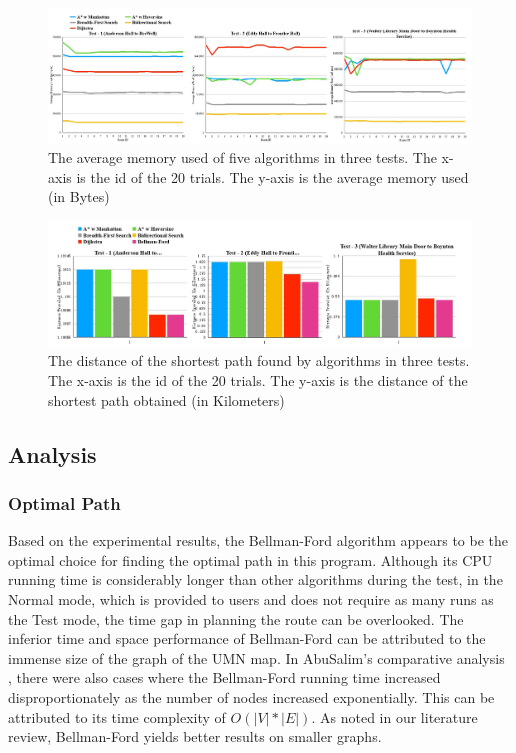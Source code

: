 \documentclass[12pt]{article}
\begin{document}
\begin{figure}[H]
\centering
\includegraphics[scale=0.36]{images/memory usage data.jpg}
\caption{The average memory used of five algorithms in three tests. The x-axis is the id of the 20 trials. The y-axis is the average memory used (in Bytes)}
\label{fig: memory usage}
\end{figure}

\begin{figure}[H]
\centering
\includegraphics[scale=0.45]{images/distance data.jpg}
\caption{The distance of the shortest path found by algorithms in three tests. The x-axis is the id of the 20 trials. The y-axis is the distance of the shortest path obtained (in Kilometers)}
\label{fig: distance traveled}
\end{figure}


\subsection{Analysis}

\subsubsection{Optimal Path}

Based on the experimental results, the Bellman-Ford algorithm appears to be the optimal choice for finding the optimal path in this program. Although its CPU running time is considerably longer than other algorithms during the test, in the Normal mode, which is provided to users and does not require as many runs as the Test mode, the time gap in planning the route can be overlooked. The inferior time and space performance of Bellman-Ford can be attributed to the immense size of the graph of the UMN map. In AbuSalim's comparative analysis \cite{AbuSalim_Ibrahim_Zainuri_Saringat_Jamel_Abdul_Wahab_2020}, there were also cases where the Bellman-Ford running time increased disproportionately as the number of nodes increased exponentially. This can be attributed to its time complexity of \(O(|V|*|E|)\). As noted in our literature review, Bellman-Ford yields better results on smaller graphs.
\end{document}
